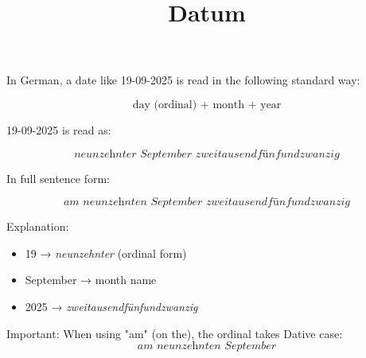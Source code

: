 \documentclass[a4paper]{article}
\title{Datum}
\date{}
\begin{document}
    \maketitle
    In German, a date like 19-09-2025 is read in the following standard way:
    
    \[
        \text{day (ordinal) + month + year}
    \]
    
    19-09-2025 is read as:
    
    \[
        \textit{neunzehnter September zweitausendfünfundzwanzig}
    \]
    
    In full sentence form:
    
    \[
        \textit{am neunzehnten September zweitausendfünfundzwanzig}
    \]
    
    Explanation:
    \begin{itemize}
        \item 19 → \textit{neunzehnter} (ordinal form)
        \item September → month name
        \item 2025 → \textit{zweitausendfünfundzwanzig}
    \end{itemize}
    
    Important:
    When using "am" (on the), the ordinal takes Dative case:
    \[
        \textit{am neunzehnten September}
    \]
\end{document}
